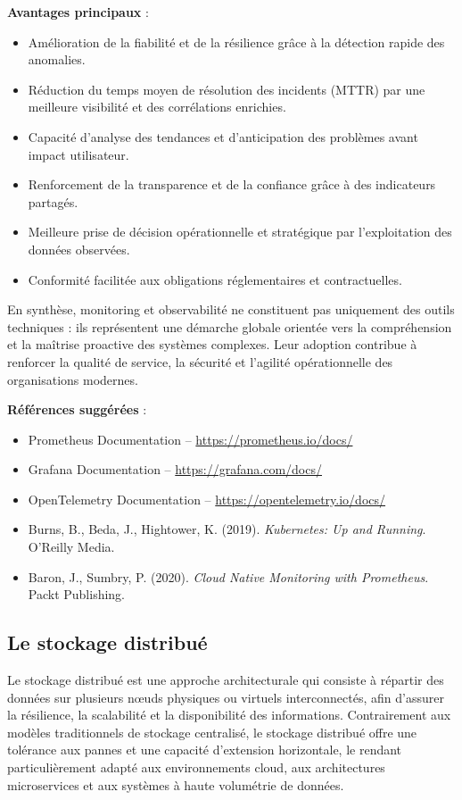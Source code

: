\textbf{Avantages principaux} :
\begin{itemize}
	\item Amélioration de la fiabilité et de la résilience grâce à la détection rapide des anomalies.
	\item Réduction du temps moyen de résolution des incidents (MTTR) par une meilleure visibilité et des corrélations enrichies.
	\item Capacité d’analyse des tendances et d’anticipation des problèmes avant impact utilisateur.
	\item Renforcement de la transparence et de la confiance grâce à des indicateurs partagés.
	\item Meilleure prise de décision opérationnelle et stratégique par l’exploitation des données observées.
	\item Conformité facilitée aux obligations réglementaires et contractuelles.
\end{itemize}

En synthèse, monitoring et observabilité ne constituent pas uniquement des outils techniques : ils représentent une démarche globale orientée vers la compréhension et la maîtrise proactive des systèmes complexes. Leur adoption contribue à renforcer la qualité de service, la sécurité et l’agilité opérationnelle des organisations modernes.

\textbf{Références suggérées} :
\begin{itemize}
	\item Prometheus Documentation – \url{https://prometheus.io/docs/}
	\item Grafana Documentation – \url{https://grafana.com/docs/}
	\item OpenTelemetry Documentation – \url{https://opentelemetry.io/docs/}
	\item Burns, B., Beda, J., Hightower, K. (2019). \textit{Kubernetes: Up and Running}. O’Reilly Media.
	\item Baron, J., Sumbry, P. (2020). \textit{Cloud Native Monitoring with Prometheus}. Packt Publishing.
\end{itemize}

\subsection{Le stockage distribué}

Le stockage distribué est une approche architecturale qui consiste à répartir des données sur plusieurs nœuds physiques ou virtuels interconnectés, afin d’assurer la résilience, la scalabilité et la disponibilité des informations. Contrairement aux modèles traditionnels de stockage centralisé, le stockage distribué offre une tolérance aux pannes et une capacité d’extension horizontale, le rendant particulièrement adapté aux environnements cloud, aux architectures microservices et aux systèmes à haute volumétrie de données.

